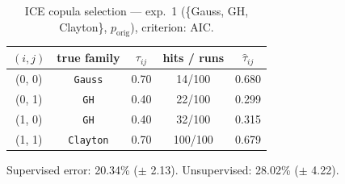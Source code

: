 \begin{table}[htbp]
  \centering
  \caption{ICE copula selection — exp.\ 1 (\{Gauss, GH, Clayton\}, $p_{\text{orig}}$), criterion: AIC.}
  \label{tab:exp3-exp1_orig_p__aic}
  \begin{tabular}{ccccc}
    \toprule
    $(i, j)$ & true family & $\tau_{ij}$ & hits / runs & $\hat\tau_{ij}$ \\
    \midrule
    (0, 0) & \texttt{Gauss} & 0.70 & 14/100 & 0.680 \\
    (0, 1) & \texttt{GH} & 0.40 & 22/100 & 0.299 \\
    (1, 0) & \texttt{GH} & 0.40 & 32/100 & 0.315 \\
    (1, 1) & \texttt{Clayton} & 0.70 & 100/100 & 0.679 \\
    \bottomrule
  \end{tabular}
  \par\smallskip Supervised error: 20.34\% ($\pm$ 2.13). Unsupervised: 28.02\% ($\pm$ 4.22).
\end{table}
